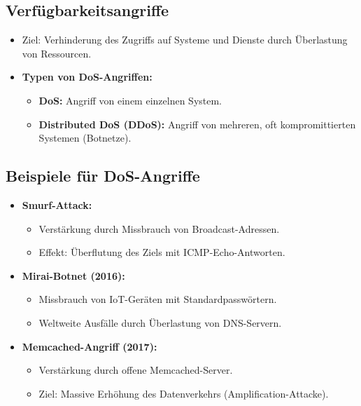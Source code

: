 \documentclass{article}
\begin{document}
\subsection{Verfügbarkeitsangriffe}
\begin{itemize}
    \item Ziel: Verhinderung des Zugriffs auf Systeme und Dienste durch Überlastung von Ressourcen.
    \item \textbf{Typen von DoS-Angriffen:}
    \begin{itemize}
        \item \textbf{DoS:} Angriff von einem einzelnen System.
        \item \textbf{Distributed DoS (DDoS):} Angriff von mehreren, oft kompromittierten Systemen (Botnetze).
    \end{itemize}
\end{itemize}

\subsection{Beispiele für DoS-Angriffe}
\begin{itemize}
    \item \textbf{Smurf-Attack:}
    \begin{itemize}
        \item Verstärkung durch Missbrauch von Broadcast-Adressen.
        \item Effekt: Überflutung des Ziels mit ICMP-Echo-Antworten.
    \end{itemize}
    \item \textbf{Mirai-Botnet (2016):}
    \begin{itemize}
        \item Missbrauch von IoT-Geräten mit Standardpasswörtern.
        \item Weltweite Ausfälle durch Überlastung von DNS-Servern.
    \end{itemize}
    \item \textbf{Memcached-Angriff (2017):}
    \begin{itemize}
        \item Verstärkung durch offene Memcached-Server.
        \item Ziel: Massive Erhöhung des Datenverkehrs (Amplification-Attacke).
    \end{itemize}
\end{itemize}
\end{document}
